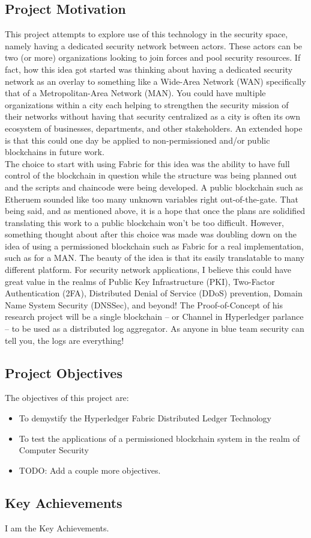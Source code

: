 	\subsection{Project Motivation}
		\hspace{10mm}This project attempts to explore use of this technology in the security space, namely having a dedicated security network between actors. These actors can be two (or more) organizations looking to join forces and pool security resources. If fact, how this idea got started was thinking about having a dedicated security network as an overlay to something like a Wide-Area Network (WAN) specifically that of a Metropolitan-Area Network (MAN). You could have multiple organizations within a city each helping to strengthen the security mission of their networks without having that security centralized as a city is often its own ecosystem of businesses, departments, and other stakeholders. An extended hope is that this could one day be applied to non-permissioned and/or public blockchains in future work.\\
	
		\hspace{10mm}The choice to start with using Fabric for this idea was the ability to have full control of the blockchain in question while the structure was being planned out and the scripts and chaincode were being developed. A public blockchain such as Etheruem sounded like too many unknown variables right out-of-the-gate. That being said, and as mentioned above, it is a hope that once the plans are solidified translating this work to a public blockchain won't be too difficult. However, something thought about after this choice was made was doubling down on the idea of using a permissioned blockchain such as Fabric for a real implementation, such as for a MAN. The beauty of the idea is that its easily translatable to many different platform. For security network applications, I believe this could have great value in the realms of Public Key Infrastructure (PKI), Two-Factor Authentication (2FA), Distributed Denial of Service (DDoS) prevention, Domain Name System Security (DNSSec), and beyond! The Proof-of-Concept of his research project will be a single blockchain -- or Channel in Hyperledger parlance -- to be used as a distributed log aggregator. As anyone in blue team security can tell you, the logs are everything!\\
	
	\subsection{Project Objectives}
		\hspace{10mm}The objectives of this project are:
		\begin{itemize}
			\item To demystify the Hyperledger Fabric Distributed Ledger Technology
			\item To test the applications of a permissioned blockchain system in the realm of Computer Security
			\item TODO: Add a couple more objectives.
		\end{itemize}
	\subsection{Key Achievements} 
		\hspace{10mm}I am the Key Achievements.\\
